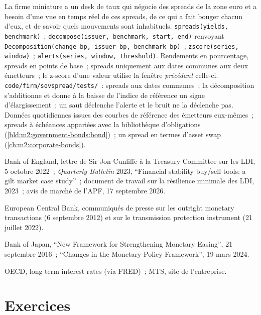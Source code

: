 \begin{build}
 La firme miniature a un desk de taux qui négocie des spreads de la zone euro et
a besoin d'une vue en temps réel de ces spreads, de ce qui a fait bouger chacun d'eux, et de savoir quels mouvements sont
inhabituels.
 \texttt{spreads(yields, benchmark)}~;
\texttt{decompose(issuer, benchmark, start, end)} renvoyant
\texttt{Decomposition(change\_bp, issuer\_bp, benchmark\_bp)}~;
\texttt{zscore(series, window)}~; \texttt{alerts(series, window, threshold)}.
 Rendements en pourcentage, spreads en points de base~; spreads uniquement aux
dates communes aux deux émetteurs~; le z-score d'une valeur utilise la fenêtre
\emph{précédant} celle-ci.
 \texttt{code/firm/sovspread/tests/}~: spreads aux dates communes~; la décomposition
s'additionne et donne à la baisse de l'indice de référence un
signe d'élargissement~; un saut déclenche l'alerte et le bruit ne la déclenche pas.
 Données quotidiennes issues des courbes de référence des émetteurs eux-mêmes~; spreads
à échéances appariées avec la bibliothèque d'obligations
(\cref{bld:m2:government-bonds:bond})~; un spread en termes d'asset swap
(\cref{ch:m2:corporate-bonds}).
\end{build}

\begin{omsources}
\item Bank of England, lettre de Sir Jon Cunliffe à la Treasury Committee sur
les LDI, 5 octobre 2022~; \emph{Quarterly Bulletin} 2023, ``Financial stability buy/sell
tools: a gilt market case study''~; document de travail sur la résilience minimale des LDI, 2023~;
avis de marché de l'APF, 17 septembre 2026.
\item European Central Bank, communiqués de presse sur les outright monetary transactions
(6 septembre 2012) et sur le transmission protection instrument (21 juillet 2022).
\item Bank of Japan, ``New Framework for Strengthening Monetary Easing'', 21
septembre 2016~; ``Changes in the Monetary Policy Framework'', 19 mars 2024.
\item OECD, long-term interest rates (via FRED)~; MTS, site de l'entreprise.
\end{omsources}

\section{Exercices}

